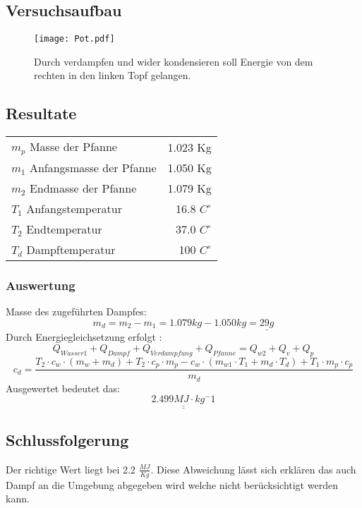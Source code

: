 \documentclass{article}
\begin{document}
\subsection{Versuchsaufbau}
\begin{figure}[H]
\texttt{[image: Pot.pdf]} 
\caption{Durch verdampfen und wider kondensieren soll Energie von dem rechten in den linken Topf gelangen.}
\end{figure}
\subsection{Resultate}

\begin{tabular}[H]{l r}
$m_p$ Masse der Pfanne & 1.023 Kg \\
$m_1$ Anfangsmasse der Pfanne & 1.050 Kg \\
$m_2$ Endmasse der Pfanne &  1.079 Kg \\
$T_1$ Anfangstemperatur & 16.8 $C^\circ$ \\
$T_2$ Endtemperatur & 37.0 $C^\circ$ \\
$T_d$ Dampftemperatur & 100 $C^\circ$ 

\end{tabular}

\subsubsection{Auswertung}
Masse des zugeführten Dampfes:
\begin{equation}
m_d = m_2 - m_1 = 1.079kg - 1.050 kg = \underline{29g}  
\end{equation}
Durch Energiegleichsetzung erfolgt :
\begin{equation}
Q_{Wasser1}+Q_{Dampf}+Q_{Verdampfung}+Q_{Pfanne} = Q_{w2}+Q_{v}+Q_{p}
\end{equation}
\begin{equation}
c_{d} = \frac{T_2 \cdot c_w \cdot(m_w+m_d)+T_2\cdot c_p \cdot m_p -c_w \cdot (m_{w1}\cdot T_1 + m_d \cdot T_d)+T_1 \cdot m_p \cdot c_p}{m_d}
\end{equation}
Ausgewertet bedeutet das:
\begin{equation}
\underline{\underline{2.499 MJ \cdot kg^-1}}
\end{equation}

\subsection{Schlussfolgerung}
Der richtige Wert liegt bei 2.2 $\frac{MJ}{Kg}$. Diese Abweichung lässt sich erklären das auch Dampf an die Umgebung abgegeben wird welche nicht berücksichtigt werden kann.  
\end{document}
